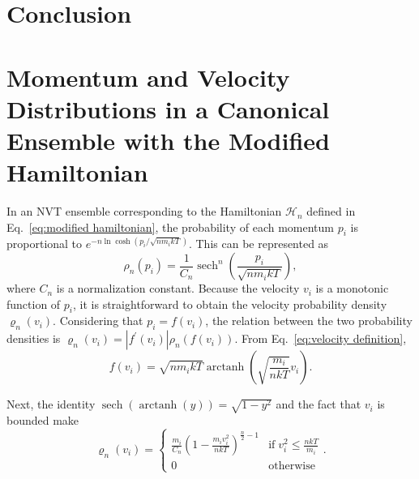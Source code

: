 \documentclass[
aip,
jcp,
reprint,
]{revtex4-1}
\DeclareMathOperator\arctanh{arctanh}
\DeclareMathOperator\sech{sech}
\begin{document}
\section{Conclusion}

\appendix

\section{Momentum and Velocity Distributions in a Canonical Ensemble with the Modified Hamiltonian}
\label{sec:momentum and velocity distributions}

In an NVT ensemble corresponding to the Hamiltonian ${\mathcal H}_n$ defined in Eq.~\eqref{eq:modified hamiltonian}, the probability of each momentum $p_i$ is proportional to $e^{-n\ln\cosh(p_i/\sqrt{n m_i kT})}$.
This can be represented as
\begin{equation*}
\rho_n(p_i) = \frac{1}{C_n} \sech^n\left(\frac{p_i}{\sqrt{n m_i k T}}\right),
\end{equation*}
where $C_n$ is a normalization constant.
Because the velocity $v_i$ is a monotonic function of $p_i$, it is straightforward to obtain the velocity probability density $\varrho_n(v_i)$.
Considering that $p_i = f(v_i)$, the relation between the two probability densities is $\varrho_n(v_i) = |f^\prime(v_i)| \rho_n\left(f(v_i)\right)$.
From Eq.~\eqref{eq:velocity definition},
\begin{equation}
\label{eq:momentum as a function of velocity}
f(v_i) = \sqrt{n m_i k T}\arctanh\left(\sqrt{\frac{m_i}{n k T}} v_i\right).
\end{equation}


Next, the identity $\sech(\arctanh(y)) = \sqrt{1-y^2}$ and the fact that $v_i$ is bounded make
\begin{equation*}
\varrho_n(v_i) = \begin{cases}
\frac{m_i}{C_n} \left(1-\frac{m_i v_i^2}{n k T}\right)^{\frac{n}{2} - 1} & \mathrm{if} \; v_i^2 \leq \frac{n k T}{m_i} \\
0 & \mathrm{otherwise}
\end{cases}.
\end{equation*}
\end{document}
